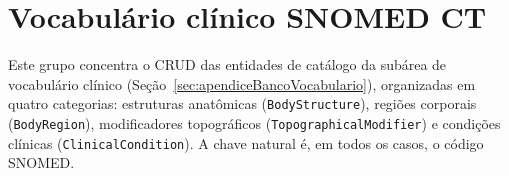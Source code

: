 \section{Vocabulário clínico SNOMED CT}\label{sec:apendiceaSNOMED}

Este grupo concentra o CRUD das entidades de catálogo da subárea de vocabulário clínico (Seção~\ref{sec:apendiceBancoVocabulario}), organizadas em quatro categorias: estruturas anatômicas (\texttt{BodyStructure}), regiões corporais (\texttt{BodyRegion}), modificadores topográficos (\texttt{TopographicalModifier}) e condições clínicas (\texttt{ClinicalCondition}). A chave natural é, em todos os casos, o código SNOMED.

